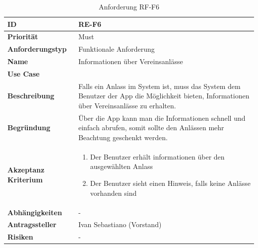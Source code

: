 \begin{table}[ht]
\centering
  \begin{tabular}{ l | p{8cm} }
	\hline
	\rowcolor{gray}
	\textbf{ID} 			&	\textbf{RE-F6}\\ \hline
	\textbf{Priorität} 		&	Must\\ \hline
	\textbf{Anforderungstyp}	&	Funktionale Anforderung\\ \hline
	\textbf{Name} 			&	Informationen über Vereinsanlässe\\ \hline
	\textbf{Use Case} 		&	\nameref{table:use_case_5}\\ \hline
	\textbf{Beschreibung} 	&	Falls ein Anlass im System ist, muss das System dem Benutzer der App die Möglichkeit bieten, Informationen über Vereinsanlässe zu erhalten.\\ \hline
	\textbf{Begründung} 		&	Über die App kann man die Informationen schnell und einfach abrufen, somit sollte den Anlässen mehr Beachtung geschenkt werden.\\ \hline
	\textbf{Akzeptanz Kriterium}	&	\begin{enumerate}
					\item Der Benutzer erhält informationen über den ausgewählten Anlass
					\item Der Benutzer sieht einen Hinweis, falls keine Anlässe vorhanden sind
					\end{enumerate}
					\\ \hline
	\textbf{Abhängigkeiten} 	&	-\\ \hline
	\textbf{Antragssteller} 	&	Ivan Sebastiano (Vorstand)\\ \hline
	\textbf{Risiken}	 	&	-
  \end{tabular}
   \caption{Anforderung RF-F6}\label{table:req_6}
\end{table}

